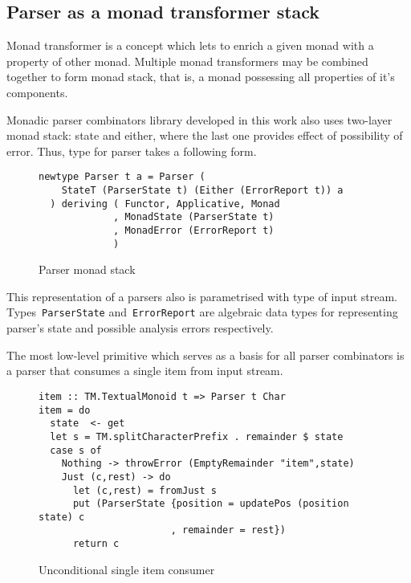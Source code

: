     \subsection{Parser as a monad transformer stack}

      Monad transformer is a concept which lets to enrich a given monad with a
      property of other monad. Multiple monad transformers may be combined
      together to form monad stack, that is, a monad possessing all properties of
      it's components.

      Monadic parser combinators library developed in this work also uses two-layer monad
      stack: state and either,
      where the last one provides effect of possibility of error. Thus, type for parser
      takes a following form.

      \begin{figure}[h]
      \begin{lstlisting}
newtype Parser t a = Parser (
    StateT (ParserState t) (Either (ErrorReport t)) a
  ) deriving ( Functor, Applicative, Monad
             , MonadState (ParserState t)
             , MonadError (ErrorReport t)
             )
      \end{lstlisting}
      \caption{Parser monad stack}
      \label{listing:mtlParser}
      \end{figure}

      This representation of a parsers also is parametrised with type of input stream.
      Types~\texttt{ParserState} and~\texttt{ErrorReport} are algebraic
      data types for representing parser's state and possible analysis errors
      respectively.

      The most low-level primitive which serves as a basis for all parser combinators
      is a parser that consumes a single item from input stream.

      \begin{figure}[h]
      \begin{lstlisting}
item :: TM.TextualMonoid t => Parser t Char
item = do
  state  <- get
  let s = TM.splitCharacterPrefix . remainder $ state
  case s of
    Nothing -> throwError (EmptyRemainder "item",state)
    Just (c,rest) -> do
      let (c,rest) = fromJust s
      put (ParserState {position = updatePos (position state) c
                       , remainder = rest})
      return c
      \end{lstlisting}
      \caption{Unconditional single item consumer}
      \label{listing:mtlParserItem}
      \end{figure}

